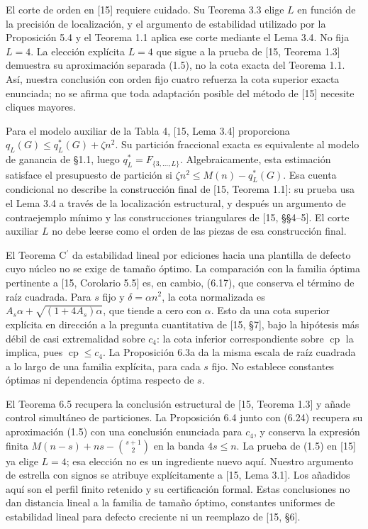 \documentclass[spanish,11pt,a4paper]{article}
\begin{document}
El corte de orden en {[}15{]} requiere cuidado. Su Teorema 3.3 elige \(L\) en función de la precisión de localización, y el argumento de estabilidad utilizado por la Proposición 5.4 y el Teorema 1.1 aplica ese corte mediante el Lema 3.4. No fija \(L=4\). La elección explícita \(L=4\) que sigue a la prueba de {[}15, Teorema 1.3{]} demuestra su aproximación separada (1.5), no la cota exacta del Teorema 1.1. Así, nuestra conclusión con orden fijo cuatro refuerza la cota superior exacta enunciada; no se afirma que toda adaptación posible del método de {[}15{]} necesite cliques mayores.

Para el modelo auxiliar de la Tabla 4, {[}15, Lema 3.4{]} proporciona \(q_L(G)\le q_L^*(G)+\zeta n^2\). Su partición fraccional exacta es equivalente al modelo de ganancia de §1.1, luego \(q_L^*=F_{\{3,\ldots,L\}}\). Algebraicamente, esta estimación satisface el presupuesto de partición si \(\zeta n^2\le M(n)-q_L^*(G)\). Esa cuenta condicional no describe la construcción final de {[}15, Teorema 1.1{]}: su prueba usa el Lema 3.4 a través de la localización estructural, y después un argumento de contraejemplo mínimo y las construcciones triangulares de {[}15, §§4--5{]}. El corte auxiliar \(L\) no debe leerse como el orden de las piezas de esa construcción final.

El Teorema \texorpdfstring{C\ensuremath{^{\prime}}}{C'} da estabilidad lineal por ediciones hacia una plantilla de defecto cuyo núcleo no se exige de tamaño óptimo. La comparación con la familia óptima pertinente a {[}15, Corolario 5.5{]} es, en cambio, (6.17), que conserva el término de raíz cuadrada. Para \(s\) fijo y \(\delta=\alpha n^2\), la cota normalizada es \(A_s\alpha+\sqrt{(1+4A_s)\alpha}\), que tiende a cero con \(\alpha\). Esto da una cota superior explícita en dirección a la pregunta cuantitativa de {[}15, §7{]}, bajo la hipótesis más débil de casi extremalidad sobre \(c_4\): la cota inferior correspondiente sobre \(\operatorname{cp}\) la implica, pues \(\operatorname{cp}\le c_4\). La Proposición 6.3a da la misma escala de raíz cuadrada a lo largo de una familia explícita, para cada \(s\) fijo. No establece constantes óptimas ni dependencia óptima respecto de \(s\).

El Teorema 6.5 recupera la conclusión estructural de {[}15, Teorema 1.3{]} y añade control simultáneo de particiones. La Proposición 6.4 junto con (6.24) recupera su aproximación (1.5) con una conclusión enunciada para \(c_4\), y conserva la expresión finita \(M(n-s)+ns-\binom{s+1}{2}\) en la banda \(4s\le n\). La prueba de (1.5) en {[}15{]} ya elige \(L=4\); esa elección no es un ingrediente nuevo aquí. Nuestro argumento de estrella con signos se atribuye explícitamente a {[}15, Lema 3.1{]}. Los añadidos aquí son el perfil finito retenido y su certificación formal. Estas conclusiones no dan distancia lineal a la familia de tamaño óptimo, constantes uniformes de estabilidad lineal para defecto creciente ni un reemplazo de {[}15, §6{]}.
\end{document}
